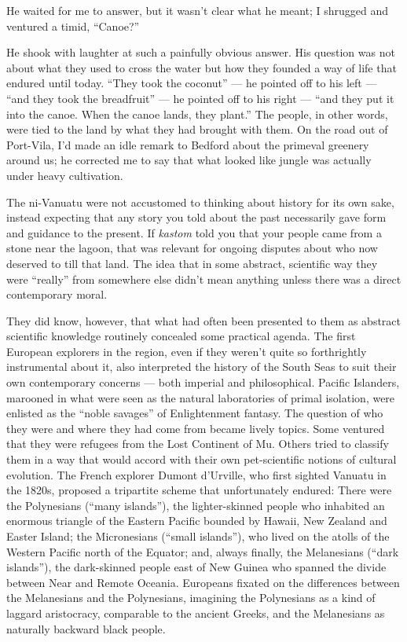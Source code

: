 He waited for me to answer, but it wasn't clear what he meant; I
shrugged and ventured a timid, ``Canoe?''

He shook with laughter at such a painfully obvious answer. His question
was not about what they used to cross the water but how they founded a
way of life that endured until today. ``They took the coconut'' --- he
pointed off to his left --- ``and they took the breadfruit'' --- he
pointed off to his right --- ``and they put it into the canoe. When the
canoe lands, they plant.'' The people, in other words, were tied to the
land by what they had brought with them. On the road out of Port-Vila,
I'd made an idle remark to Bedford about the primeval greenery around
us; he corrected me to say that what looked like jungle was actually
under heavy cultivation.

The ni-Vanuatu were not accustomed to thinking about history for its own
sake, instead expecting that any story you told about the past
necessarily gave form and guidance to the present. If \emph{kastom} told
you that your people came from a stone near the lagoon, that was
relevant for ongoing disputes about who now deserved to till that land.
The idea that in some abstract, scientific way they were ``really'' from
somewhere else didn't mean anything unless there was a direct
contemporary moral.

They did know, however, that what had often been presented to them as
abstract scientific knowledge routinely concealed some practical agenda.
The first European explorers in the region, even if they weren't quite
so forthrightly instrumental about it, also interpreted the history of
the South Seas to suit their own contemporary concerns --- both imperial
and philosophical. Pacific Islanders, marooned in what were seen as the
natural laboratories of primal isolation, were enlisted as the ``noble
savages'' of Enlightenment fantasy. The question of who they were and
where they had come from became lively topics. Some ventured that they
were refugees from the Lost Continent of Mu. Others tried to classify
them in a way that would accord with their own pet-scientific notions of
cultural evolution. The French explorer Dumont d'Urville, who first
sighted Vanuatu in the 1820s, proposed a tripartite scheme that
unfortunately endured: There were the Polynesians (``many islands''),
the lighter-skinned people who inhabited an enormous triangle of the
Eastern Pacific bounded by Hawaii, New Zealand and Easter Island; the
Micronesians (``small islands''), who lived on the atolls of the Western
Pacific north of the Equator; and, always finally, the Melanesians
(``dark islands''), the dark-skinned people east of New Guinea who
spanned the divide between Near and Remote Oceania. Europeans fixated on
the differences between the Melanesians and the Polynesians, imagining
the Polynesians as a kind of laggard aristocracy, comparable to the
ancient Greeks, and the Melanesians as naturally backward black people.

